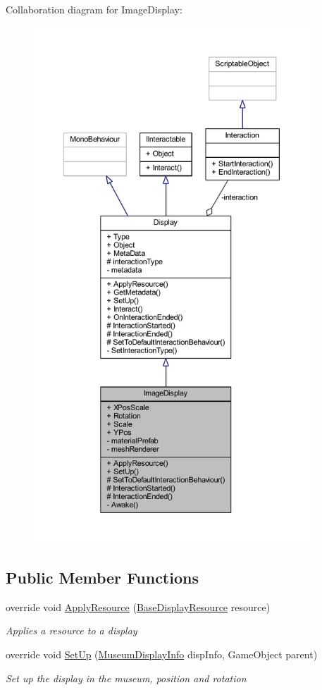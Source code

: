 Collaboration diagram for Image\+Display\+:
\nopagebreak
\begin{figure}[H]
\begin{center}
\leavevmode
\includegraphics[height=550pt]{class_image_display__coll__graph}
\end{center}
\end{figure}
\subsection*{Public Member Functions}
\begin{DoxyCompactItemize}
\item 
override void \mbox{\hyperlink{class_image_display_ab4cae8c66db7e7d77ab117fe24e63980}{Apply\+Resource}} (\mbox{\hyperlink{class_base_display_resource}{Base\+Display\+Resource}} resource)
\begin{DoxyCompactList}\small\item\em Applies a resource to a display \end{DoxyCompactList}\item 
override void \mbox{\hyperlink{class_image_display_a28fead7caeeb12490d26fae943da6a1e}{Set\+Up}} (\mbox{\hyperlink{class_museum_display_info}{Museum\+Display\+Info}} disp\+Info, Game\+Object parent)
\begin{DoxyCompactList}\small\item\em Set up the display in the museum, position and rotation \end{DoxyCompactList}\end{DoxyCompactItemize}
